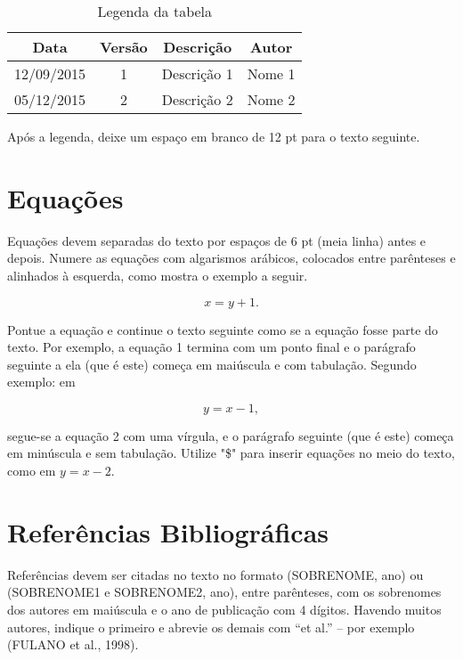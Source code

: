 \documentclass[
	article,			%
	12pt,				%
	oneside,			%
	a4paper,			%
	english,			%
	brazil,				%
	sumario=tradicional
	]{abntex2}
\begin{document}
\begin{table}[H]     %
\centering
\caption{Legenda da tabela}
\label{my-label}

\begin{tabular}{c|c|c|c}
Data       & Versão & Descrição   & Autor  \\ \hline
12/09/2015 & 1      & Descrição 1 & Nome 1 \\
05/12/2015 & 2      & Descrição 2 & Nome 2
\end{tabular}
\end{table}

Após a legenda, deixe um espaço em branco de 12 pt para o texto seguinte. 

\section{Equações}

Equações devem separadas do texto por espaços de 6 pt (meia linha) antes e depois.  Numere as equações com algarismos arábicos, colocados entre parênteses e alinhados à esquerda,  como mostra o exemplo a seguir.

\begin{equation}
x = y+1.
\end{equation}

Pontue a equação e continue o texto seguinte como se a equação fosse parte do texto.  Por exemplo, a equação 1 termina com um ponto final e o parágrafo seguinte a ela (que é este) começa em maiúscula e com tabulação.  Segundo exemplo: em

\begin{displaymath}
y = x-1,
\end{displaymath}

segue-se a equação 2 com uma vírgula, e o parágrafo seguinte (que é este) começa em minúscula e sem tabulação. Utilize "\$"  para inserir equações no meio do texto, como em $y=x-2$.

\section{Referências Bibliográficas}

Referências devem ser citadas no texto no formato (SOBRENOME, ano) ou (SOBRENOME1 e SOBRENOME2, ano), entre parênteses, com os sobrenomes dos autores em maiúscula e o ano de publicação com 4 dígitos.  Havendo muitos autores, indique o primeiro e abrevie os demais com “et al.” – por exemplo (FULANO et al., 1998).
\end{document}
